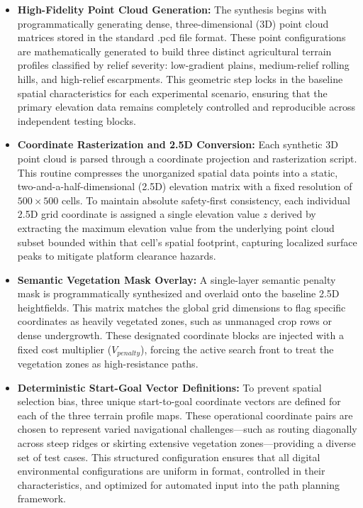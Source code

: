 \begin{itemize}
    \item \textbf{High-Fidelity Point Cloud Generation:} The synthesis begins with programmatically generating dense, three-dimensional (3D) point cloud matrices stored in the standard .pcd file format. These point configurations are mathematically generated to build three distinct agricultural terrain profiles classified by relief severity: low-gradient plains, medium-relief rolling hills, and high-relief escarpments. This geometric step locks in the baseline spatial characteristics for each experimental scenario, ensuring that the primary elevation data remains completely controlled and reproducible across independent testing blocks.

    \item \textbf{Coordinate Rasterization and 2.5D Conversion:} Each synthetic 3D point cloud is parsed through a coordinate projection and rasterization script. This routine compresses the unorganized spatial data points into a static, two-and-a-half-dimensional (2.5D) elevation matrix with a fixed resolution of $500 \times 500$ cells. To maintain absolute safety-first consistency, each individual 2.5D grid coordinate is assigned a single elevation value $z$ derived by extracting the maximum elevation value from the underlying point cloud subset bounded within that cell's spatial footprint, capturing localized surface peaks to mitigate platform clearance hazards.

    \item \textbf{Semantic Vegetation Mask Overlay:} A single-layer semantic penalty mask is programmatically synthesized and overlaid onto the baseline 2.5D heightfields. This matrix matches the global grid dimensions to flag specific coordinates as heavily vegetated zones, such as unmanaged crop rows or dense undergrowth. These designated coordinate blocks are injected with a fixed cost multiplier ($V_{penalty}$), forcing the active search front to treat the vegetation zones as high-resistance paths.

    \item \textbf{Deterministic Start-Goal Vector Definitions:} To prevent spatial selection bias, three unique start-to-goal coordinate vectors are defined for each of the three terrain profile maps. These operational coordinate pairs are chosen to represent varied navigational challenges---such as routing diagonally across steep ridges or skirting extensive vegetation zones---providing a diverse set of test cases. This structured configuration ensures that all digital environmental configurations are uniform in format, controlled in their characteristics, and optimized for automated input into the path planning framework.
\end{itemize}

